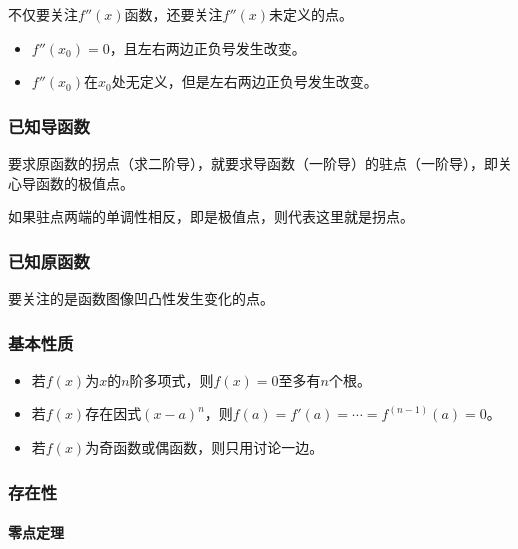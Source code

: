 不仅要关注$f''(x)$函数，还要关注$f''(x)$未定义的点。

\begin{itemize}
    \item $f''(x_0)=0$，且左右两边正负号发生改变。
    \item $f''(x_0)$在$x_0$处无定义，但是左右两边正负号发生改变。
\end{itemize}

\subsubsection{已知导函数}

要求原函数的拐点（求二阶导），就要求导函数（一阶导）的驻点（一阶导），即关心导函数的极值点。

如果驻点两端的单调性相反，即是极值点，则代表这里就是拐点。

\subsubsection{已知原函数}

要关注的是函数图像凹凸性发生变化的点。

\paragraph{}

\subsubsection{基本性质}

\begin{itemize}
    \item 若$f(x)$为$x$的$n$阶多项式，则$f(x)=0$至多有$n$个根。
    \item 若$f(x)$存在因式$(x-a)^n$，则$f(a)=f'(a)=\cdots=f^{(n-1)}(a)=0$。
    \item 若$f(x)$为奇函数或偶函数，则只用讨论一边。
\end{itemize}

\subsubsection{存在性}

\paragraph{零点定理} \leavevmode \medskip

